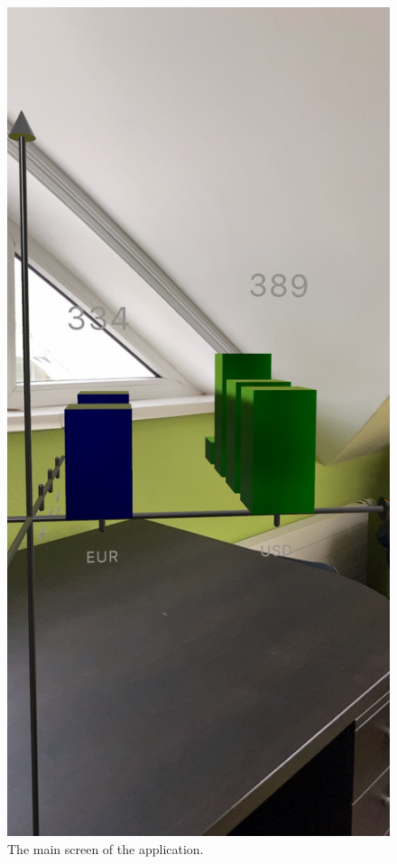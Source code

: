 \documentclass[11pt,a4paper,oneside]{report}
\begin{document}
\begin{figure}[!ht]
  \centering
  \includegraphics[scale=0.2]{front.jpeg}
  \caption{The main screen of the application.}
  \label{fig:TexnicCenter}
\end{figure}
\end{document}
